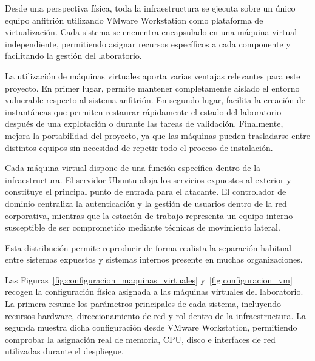 Desde una perspectiva física, toda la infraestructura se ejecuta sobre un único equipo anfitrión utilizando VMware Workstation como plataforma de virtualización. Cada sistema se encuentra encapsulado en una máquina virtual independiente, permitiendo asignar recursos específicos a cada componente y facilitando la gestión del laboratorio.

La utilización de máquinas virtuales aporta varias ventajas relevantes para este proyecto. En primer lugar, permite mantener completamente aislado el entorno vulnerable respecto al sistema anfitrión. En segundo lugar, facilita la creación de instantáneas que permiten restaurar rápidamente el estado del laboratorio después de una explotación o durante las tareas de validación. Finalmente, mejora la portabilidad del proyecto, ya que las máquinas pueden trasladarse entre distintos equipos sin necesidad de repetir todo el proceso de instalación.

Cada máquina virtual dispone de una función específica dentro de la infraestructura. El servidor Ubuntu aloja los servicios expuestos al exterior y constituye el principal punto de entrada para el atacante. El controlador de dominio centraliza la autenticación y la gestión de usuarios dentro de la red corporativa, mientras que la estación de trabajo representa un equipo interno susceptible de ser comprometido mediante técnicas de movimiento lateral.

Esta distribución permite reproducir de forma realista la separación habitual entre sistemas expuestos y sistemas internos presente en muchas organizaciones.

Las Figuras~\ref{fig:configuracion_maquinas_virtuales} y~\ref{fig:configuracion_vm} recogen la configuración física asignada a las máquinas virtuales del laboratorio. La primera resume los parámetros principales de cada sistema, incluyendo recursos hardware, direccionamiento de red y rol dentro de la infraestructura. La segunda muestra dicha configuración desde VMware Workstation, permitiendo comprobar la asignación real de memoria, CPU, disco e interfaces de red utilizadas durante el despliegue.

